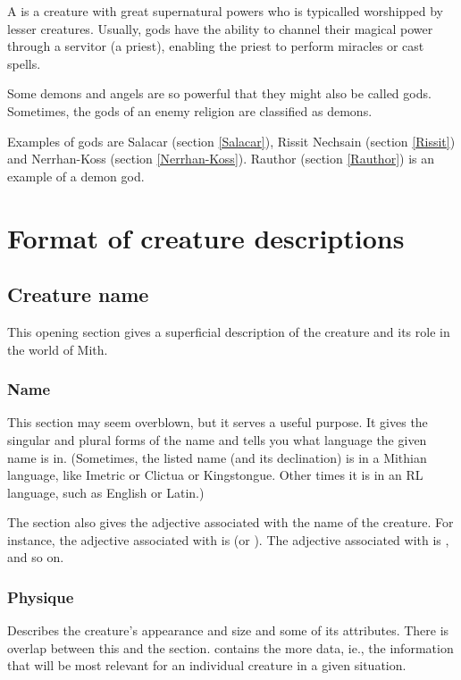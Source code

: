 A  is a creature with great supernatural powers who is typicalled worshipped by lesser creatures. Usually, gods have the ability to channel their magical power through a servitor (a priest), enabling the priest to perform miracles or cast spells.%

Some demons and angels are so powerful that they might also be called gods. Sometimes, the gods of an enemy religion are classified as demons. 

Examples of gods are Salacar (section \ref{Salacar}), Rissit Nechsain (section \ref{Rissit}) and Nerrhan-Koss (section \ref{Nerrhan-Koss}). Rauthor (section \ref{Rauthor}) is an example of a demon god. 





\newpage
\section{Format of creature descriptions}
\subsection{Creature name}

This opening section gives a superficial description of the creature and its role in the world of Mith. 

\subsubsection{Name}
This section may seem overblown, but it serves a useful purpose. It gives the singular and plural forms of the name and tells you what language the given name is in. (Sometimes, the listed name (and its declination) is in a Mithian language, like Imetric or Clictua or \Draconic{} Kingstongue. Other times it is in an RL language, such as English or Latin.) 

The  section also gives the adjective associated with the name of the creature. For instance, the adjective associated with  is  (or ). The adjective associated with \quo{\dragon{}} is \quo{\draconic{}}, and so on. 

\subsubsection{Physique}
Describes the creature's appearance and size and some of its attributes. There is overlap between this and the  section.  contains the more  data, ie., the information that will be most relevant for an individual creature in a given situation. 

